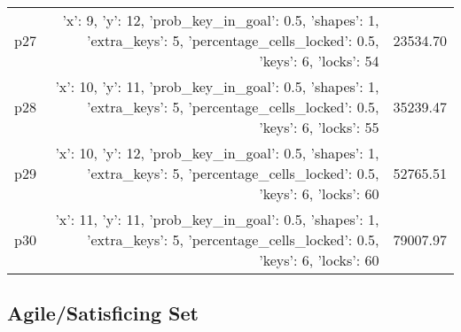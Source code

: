 \documentclass{article}
\begin{document}
\begin{center}
\begin{tabular}{@{}l|r|r@{}}
  p27&{'x': 9, 'y': 12, 'prob\_key\_in\_goal': 0.5, 'shapes': 1, 'extra\_keys': 5, 'percentage\_cells\_locked': 0.5, 'keys': 6, 'locks': 54}&23534.70\\
  p28&{'x': 10, 'y': 11, 'prob\_key\_in\_goal': 0.5, 'shapes': 1, 'extra\_keys': 5, 'percentage\_cells\_locked': 0.5, 'keys': 6, 'locks': 55}&35239.47\\
  p29&{'x': 10, 'y': 12, 'prob\_key\_in\_goal': 0.5, 'shapes': 1, 'extra\_keys': 5, 'percentage\_cells\_locked': 0.5, 'keys': 6, 'locks': 60}&52765.51\\
  p30&{'x': 11, 'y': 11, 'prob\_key\_in\_goal': 0.5, 'shapes': 1, 'extra\_keys': 5, 'percentage\_cells\_locked': 0.5, 'keys': 6, 'locks': 60}&79007.97
                            \end{tabular}
                            \end{center}
                    

                                \subsection*{Agile/Satisficing Set}
                                
\end{document}
